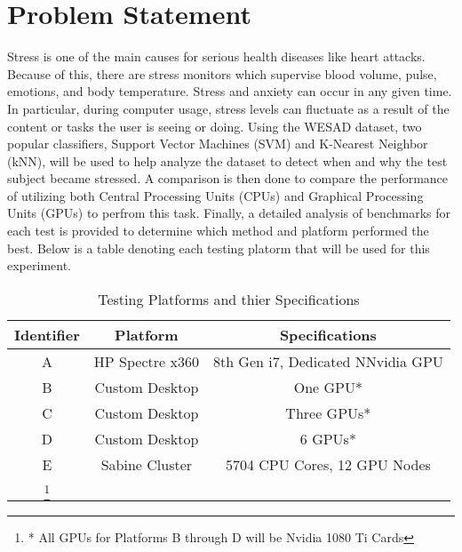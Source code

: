 \section{Problem Statement}
\label{sec:Problem-Statement}

Stress is one of the main causes for serious health diseases like heart attacks. 
Because of this, there are stress monitors which supervise  blood volume, pulse, emotions, and 
body temperature. Stress and anxiety can occur in any given time. In particular, during computer usage, stress levels 
can fluctuate as a result of the content or tasks the user is seeing or doing. Using the WESAD dataset, two popular 
classifiers, Support Vector Machines (SVM) and K-Nearest Neighbor (kNN), will be used to help analyze the dataset 
to detect when and why the test subject became stressed. 
A comparison is then done to compare the performance of utilizing both Central Processing Units (CPUs) and 
Graphical Processing Units (GPUs) to perfrom this task. 
Finally, a detailed analysis of benchmarks for each test is provided to determine which method and platform 
performed the best. Below is a table denoting each testing platorm that will be used for this experiment. 

\begin{table}[h!]
\centering
\caption{Testing Platforms and thier Specifications}
\label{table:testing-platforms}
\begin{tabular}{||c c c||} 
 \hline
 Identifier & Platform  & Specifications  	\\ [0.5ex] 
 \hline\hline
 A 	& HP Spectre x360 	 & 8th Gen i7, Dedicated NNvidia GPU 	\\ 
 B 	& Custom Desktop	 & One GPU*   	\\
 C 	& Custom Desktop	 & Three GPUs*	\\
 D 	& Custom Desktop	 & 6 GPUs*	\\
 E 	& Sabine Cluster	 & 5704 CPU Cores, 12 GPU Nodes 	 	\\ [1ex] 
 \hline
\footnote{* All GPUs for Platforms B through D will be Nvidia 1080 Ti Cards}
\end{tabular}
\end{table}
